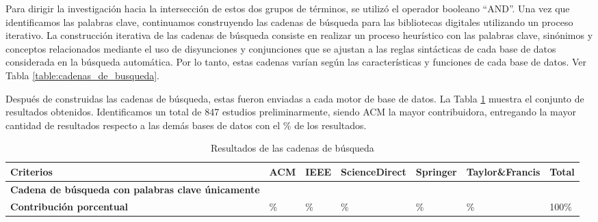 Para dirigir la investigación hacia la intersección de estos dos grupos de términos, se utilizó el operador booleano ``AND''. Una vez que identificamos las palabras clave, continuamos construyendo las cadenas de búsqueda para las bibliotecas digitales utilizando un proceso iterativo. La construcción iterativa de las cadenas de búsqueda consiste en realizar un proceso heurístico con las palabras clave, sinónimos y conceptos relacionados mediante el uso de disyunciones y conjunciones que se ajustan a las reglas sintácticas de cada base de datos considerada en la búsqueda automática. Por lo tanto, estas cadenas varían según las características y funciones de cada base de datos. Ver Tabla \ref{table:cadenas_de_busqueda}.

Después de construidas las cadenas de búsqueda, estas fueron enviadas a cada motor de base de datos. La Tabla \ref{table:search_results} muestra el conjunto de resultados obtenidos. Identificamos un total de 847 estudios preliminarmente, siendo ACM la mayor contribuidora, entregando la mayor cantidad de resultados respecto a las demás bases de datos con el \acmp\% de los resultados.



\begin{table}[htbp]
	\centering
	\caption{Resultados de las cadenas de búsqueda}
	\label{table:search_results}
	\renewcommand{\arraystretch}{1}  %
	\begin{tabular}{p{4.8cm}p{1.7cm}p{1.7cm}p{1.7cm}p{1.7cm}p{2cm}p{1.4cm}}
		\toprule
		\textbf{Criterios}                                        & \textbf{ACM} & \textbf{IEEE} & \textbf{ScienceDirect} & \textbf{Springer} & \textbf{Taylor\&Francis} & \textbf{Total} \\
		\midrule
		\textbf{Cadena de búsqueda con palabras clave únicamente} & \acm{}       & \ieee{}       & \sd{}                  & \spr{}            & \tf{}                    & \tot{}         \\
		\addlinespace[0.8em]
		\textbf{Contribución porcentual}                          & \acmp{}\%    & \ieeep{}\%    & \sdp{}\%               & \sprp{}\%         & \tfp{}\%                 & 100\%          \\
		\bottomrule
	\end{tabular}
\end{table}




